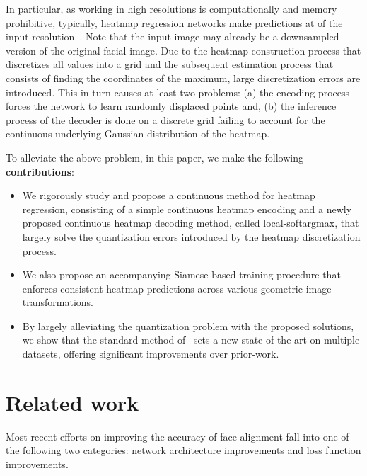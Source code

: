 \documentclass{bmvc2k}
\begin{document}
In particular, as working in high resolutions is computationally and memory prohibitive, typically, heatmap regression networks make predictions at  of the input resolution~\cite{bulat2017far}. Note that the input image may already be a downsampled version of the original facial image. Due to the heatmap construction process that discretizes all values into a grid and the subsequent estimation process that consists of finding the coordinates of the maximum, large discretization errors are introduced. This in turn causes at least two problems: (a) the encoding process forces the network to learn randomly displaced points and, (b) the inference process of the decoder is done on a discrete grid failing to account for the continuous underlying Gaussian distribution of the heatmap. 

To alleviate the above problem, in this paper, we make the following \textbf{contributions}:

\begin{itemize}
    \item We rigorously study and propose a continuous method for heatmap regression, consisting of a simple continuous heatmap encoding and a newly proposed continuous heatmap decoding method, called local-softargmax, that largely solve the quantization errors introduced by the heatmap discretization process.
    \item We also propose an accompanying Siamese-based training procedure that enforces consistent heatmap predictions across various geometric image transformations. 
    \item 
     By largely alleviating the quantization problem with the proposed solutions, we show that the standard method of~\cite{bulat2017far} sets a new state-of-the-art on multiple datasets, offering significant improvements over prior-work.
\end{itemize}

\section{Related work}

Most recent efforts on improving the accuracy of face alignment fall into one of the following two categories: network architecture improvements and loss function improvements.
\end{document}
